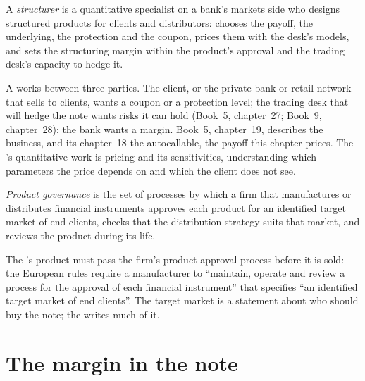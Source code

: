\begin{definition}[Structurer]\label{def:in:structurer-sales-and-sales-trader:structurer}
A \emph{structurer} is a quantitative specialist on a bank's markets side who designs structured products for clients
and distributors: chooses the payoff, the underlying, the protection and the coupon, prices them with the desk's models,
and sets the structuring margin within the product's approval and the trading desk's capacity to hedge it.
\end{definition}

A  works between three parties. The client, or the private bank or retail network that sells to clients, wants
a coupon or a protection level; the trading desk that will hedge the note wants risks it can hold (Book~5, chapter~27;
Book~9, chapter~28); the bank wants a margin. Book~5, chapter~19, describes the business, and its chapter~18 the
autocallable, the payoff this chapter prices. The 's quantitative work is pricing and
its sensitivities, understanding which parameters the price depends on and which the client does not see.

\begin{definition}\label{def:in:structurer-sales-and-sales-trader:governance}
\emph{Product governance} is the set of processes by which a firm that manufactures or
distributes financial instruments approves each product for an identified target market of end clients, checks that the
distribution strategy suits that market, and reviews the product during its life.
\end{definition}

The 's product must pass the firm's product approval process before it is sold: the European rules require a
manufacturer to ``maintain, operate and review a process for the approval of each financial instrument'' that specifies
``an identified target market of end clients''. The target market is a statement about who should buy the note; the
 writes much of it.

\section{The margin in the note}

